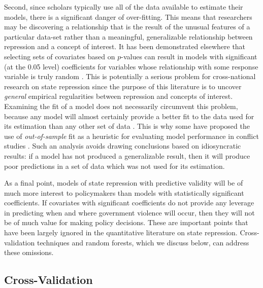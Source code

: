 \documentclass[11pt]{article}
\begin{document}
Second, since scholars typically use all of the data available to estimate their models, there is a significant danger of over-fitting. This means that researchers may be discovering a relationship that is the result of the unusual features of a particular data-set rather than a meaningful, generalizable relationship between repression and a concept of interest. It has been demonstrated elsewhere that selecting sets of covariates based on $p$-values can result in models with significant (at the 0.05 level) coefficients for variables whose relationship with some response variable is truly random \citep{Freedman1983}. This is potentially a serious problem for cross-national research on state repression since the purpose of this literature is to uncover {\em general} empirical regularities between repression and concepts of interest. Examining the fit of a model does not necessarily circumvent this problem, because any model will almost certainly provide a better fit to the data used for its estimation than any other set of data \citep[See, e.g.][]{PicardCook1984}. This is why some have proposed the use of {\em out-of-sample} fit as a heuristic for evaluating model performance in conflict studies \citep{BeckKingZeng2000,Wardetal2010}. Such an analysis avoids drawing conclusions based on idiosyncratic results: if a model has not produced a generalizable result, then it will produce poor predictions in a set of data which was not used for its estimation. 

As a final point, models of state repression with predictive validity will be of much more interest to policymakers than models with statistically significant coefficients. If covariates with significant coefficients do not provide any leverage in predicting when and where government violence will occur, then they will not be of much value for making policy decisions. These are important points that have been largely ignored in the quantitative literature  on state repression. Cross-validation techniques and random forests, which we discuss below, can address these omissions.

\subsection*{Cross-Validation}
\end{document}
